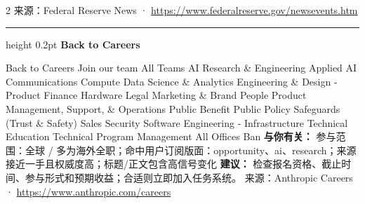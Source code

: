 \documentclass[10.5pt]{ctexart}
\begin{document}
\begin{multicols}{2}
{\footnotesize\color{ormuted} 来源：Federal Reserve News · \url{https://www.federalreserve.gov/newsevents.htm}}
\vspace{2mm}
\hrule height 0.2pt
\vspace{2mm}
{\large\bfseries Back to Careers}\par
Back to Careers Join our team All Teams AI Research \& Engineering Applied AI Communications Compute Data Science \& Analytics Engineering \& Design - Product Finance Hardware Legal Marketing \& Brand People Product Management, Support, \& Operations Public Benefit Public Policy Safeguards (Trust \& Safety) Sales Security Software Engineering - Infrastructure Technical Education Technical Program Management All Offices Ban
\textbf{与你有关：} 参与范围：全球 / 多为海外全职；命中用户订阅版面：opportunity、ai、research；来源接近一手且权威度高；标题/正文包含高信号变化
\textbf{建议：} 检查报名资格、截止时间、参与形式和预期收益；合适则立即加入任务系统。
{\footnotesize\color{ormuted} 来源：Anthropic Careers · \url{https://www.anthropic.com/careers}}
\end{multicols}
\end{document}
